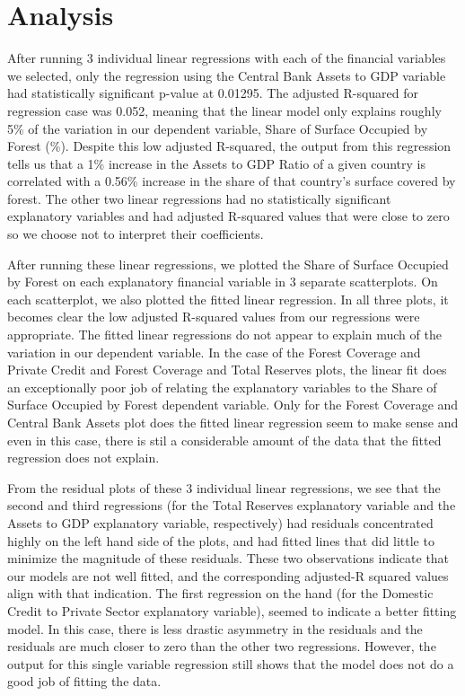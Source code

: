 \documentclass[
  12pt,
]{article}
\begin{document}
\newpage

\hypertarget{analysis}{%
\section{Analysis}\label{analysis}}

After running 3 individual linear regressions with each of the financial
variables we selected, only the regression using the Central Bank Assets
to GDP variable had statistically significant p-value at 0.01295. The
adjusted R-squared for regression case was 0.052, meaning that the
linear model only explains roughly 5\% of the variation in our dependent
variable, Share of Surface Occupied by Forest (\%). Despite this low
adjusted R-squared, the output from this regression tells us that a 1\%
increase in the Assets to GDP Ratio of a given country is correlated
with a 0.56\% increase in the share of that country's surface covered by
forest. The other two linear regressions had no statistically
significant explanatory variables and had adjusted R-squared values that
were close to zero so we choose not to interpret their coefficients.

After running these linear regressions, we plotted the Share of Surface
Occupied by Forest on each explanatory financial variable in 3 separate
scatterplots. On each scatterplot, we also plotted the fitted linear
regression. In all three plots, it becomes clear the low adjusted
R-squared values from our regressions were appropriate. The fitted
linear regressions do not appear to explain much of the variation in our
dependent variable. In the case of the Forest Coverage and Private
Credit and Forest Coverage and Total Reserves plots, the linear fit does
an exceptionally poor job of relating the explanatory variables to the
Share of Surface Occupied by Forest dependent variable. Only for the
Forest Coverage and Central Bank Assets plot does the fitted linear
regression seem to make sense and even in this case, there is stil a
considerable amount of the data that the fitted regression does not
explain.

From the residual plots of these 3 individual linear regressions, we see
that the second and third regressions (for the Total Reserves
explanatory variable and the Assets to GDP explanatory variable,
respectively) had residuals concentrated highly on the left hand side of
the plots, and had fitted lines that did little to minimize the
magnitude of these residuals. These two observations indicate that our
models are not well fitted, and the corresponding adjusted-R squared
values align with that indication. The first regression on the hand (for
the Domestic Credit to Private Sector explanatory variable), seemed to
indicate a better fitting model. In this case, there is less drastic
asymmetry in the residuals and the residuals are much closer to zero
than the other two regressions. However, the output for this single
variable regression still shows that the model does not do a good job of
fitting the data.
\end{document}
